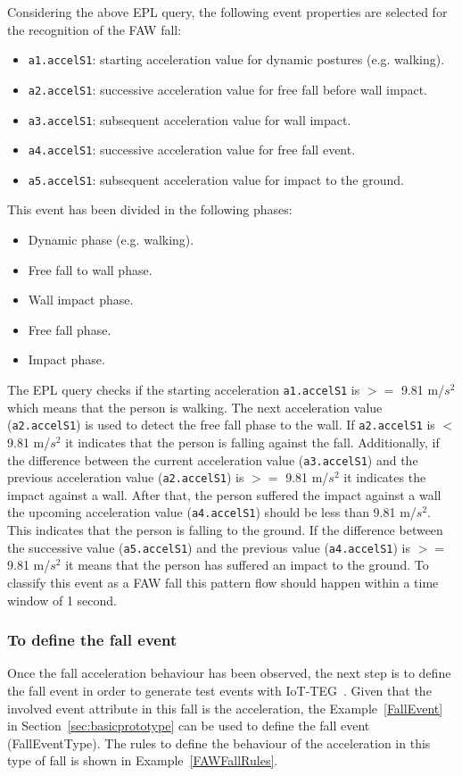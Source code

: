 \documentclass[review]{elsarticle}
\begin{document}
Considering the above EPL query, the following event properties are selected for the recognition of the FAW fall:

\begin{itemize}
  \item \texttt{a1.accelS1}: starting acceleration value for dynamic postures (e.g. walking).
  \item \texttt{a2.accelS1}: successive acceleration value for free fall before wall impact.
  \item \texttt{a3.accelS1}: subsequent acceleration value for wall impact.
  \item \texttt{a4.accelS1}: successive acceleration value for free fall event.
  \item \texttt{a5.accelS1}: subsequent acceleration value for impact to the ground.
\end{itemize}

This event has been divided in the following phases:
\begin{itemize}
  \item Dynamic phase (e.g. walking).
  \item Free fall to wall phase.
  \item Wall impact phase.
  \item Free fall phase.
  \item Impact phase.
\end{itemize}

The EPL query checks if the starting acceleration \texttt{a1.accelS1} is $>=$ 9.81 m/$s^2$ which means that the person is walking. 
The next acceleration value (\texttt{a2.accelS1}) is used to detect the free fall phase to the wall. If \texttt{a2.accelS1} 
is $<$ 9.81 m/$s^2$ it indicates that the person is falling against the fall. Additionally, if the difference between 
the current acceleration value (\texttt{a3.accelS1}) and the previous acceleration value (\texttt{a2.accelS1}) is $>=$ 9.81 m/$s^2$ 
it indicates the impact against a wall. After that, the person suffered the impact against a wall the upcoming 
acceleration value (\texttt{a4.accelS1}) should be less than 9.81 m/$s^2$. This indicates that the person is falling to 
the ground. If the difference between the successive value (\texttt{a5.accelS1}) and the previous value (\texttt{a4.accelS1}) 
is $>=$ 9.81 m/$s^2$ it means that the person has suffered an impact to the ground. To classify this event as 
a FAW fall this pattern flow should happen within a time window of 1 second.

\subsubsection*{To define the fall event} Once the fall acceleration behaviour has been observed, the next step is to define the 
fall event in order to generate test events with IoT-TEG~\cite{TesisGutierrez2017,Gutierrez2017}. Given that the involved event 
attribute in this fall is the acceleration, the Example~\ref{FallEvent} in Section~\ref{sec:basicprototype} can be used to define 
the fall event (FallEventType). The rules to define the behaviour of the acceleration in this type of fall is shown in 
Example~\ref{FAWFallRules}.
\end{document}
